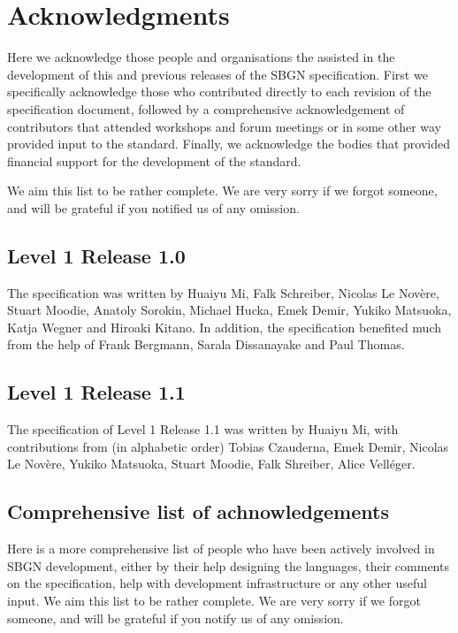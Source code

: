 \chapter{Acknowledgments}\label{sec:acknowledgments}

Here we acknowledge those people and organisations the assisted in the development of this and previous releases of the SBGN \AFl specification. First we specifically acknowledge those who contributed directly to each revision of the  specification document, followed by a comprehensive acknowledgement of contributors that attended workshops and forum meetings or in some other way provided input to the standard. Finally, we acknowledge the bodies that provided financial support for the development of the standard.


 We aim this list to be rather complete. We are very sorry if we forgot someone, and will be grateful if you notified us of any omission.

\section{Level 1 Release 1.0}

The specification was written by Huaiyu Mi, Falk Schreiber, Nicolas Le Nov\`{e}re, Stuart Moodie, Anatoly Sorokin, Michael Hucka, Emek Demir, Yukiko Matsuoka, Katja Wegner and Hiroaki Kitano. In addition, the specification benefited much from the help of Frank Bergmann, Sarala Dissanayake and Paul Thomas.

\section{Level 1 Release 1.1}
The specification of \AF Level 1 Release 1.1 was written by Huaiyu Mi, with contributions from (in alphabetic order) Tobias Czauderna, Emek Demir, Nicolas Le Nov\`{e}re, Yukiko Matsuoka, Stuart Moodie, Falk Shreiber, Alice Vell\'{e}ger.

\section{Comprehensive list of achnowledgements}

Here is a more comprehensive list of people who have been actively involved in SBGN development, either by their help designing the languages, their comments on the specification, help with development infrastructure or any other useful input.  We aim this list to be rather complete. We are very sorry if we forgot someone, and will be grateful if you notify us of any omission.

